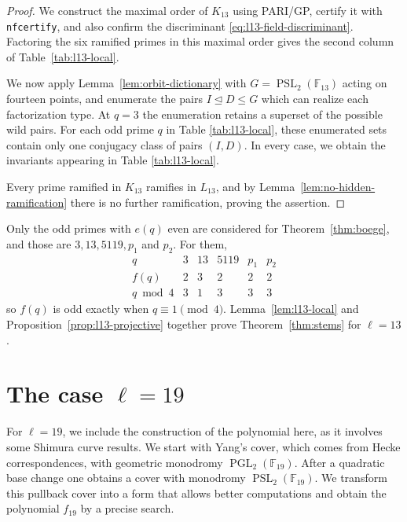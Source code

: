 \documentclass[10pt]{amsart}
\numberwithin{equation}{section}
\theoremstyle{definition}
\theoremstyle{remark}
\newcommand{\F}{\mathbb{F}}
\newcommand{\PGL}{\operatorname{PGL}}
\newcommand{\PSL}{\operatorname{PSL}}
\begin{document}
\begin{proof}
We construct the maximal order of $K_{13}$ using PARI/GP, certify it with
\texttt{nfcertify}, and also confirm the discriminant \eqref{eq:l13-field-discriminant}. Factoring the six ramified primes in this maximal order gives the second column of Table~\ref{tab:l13-local}.


We now apply Lemma~\ref{lem:orbit-dictionary} with $G=\PSL_2(\F_{13})$ acting on fourteen points, and enumerate the pairs $I\trianglelefteq D\leq G$ which can realize each factorization type. At $q=3$ the enumeration retains a superset of the possible wild pairs. For each odd prime $q$ in Table \ref{tab:l13-local}, these enumerated sets contain only one conjugacy class of pairs $(I,D)$. In every case, we obtain the invariants appearing in Table \ref{tab:l13-local}. 


Every prime ramified in $K_{13}$ ramifies in $L_{13}$, and by
Lemma~\ref{lem:no-hidden-ramification} there is no further ramification, proving the assertion.







\end{proof}

Only the odd primes with $e(q)$ even are considered for Theorem~\ref{thm:boege}, and
those are $3,13,5119,p_1$ and $p_2$.  For them,
\[
\begin{array}{c|ccccc}
 q & 3&13&5119&p_1&p_2\\
 \hline
 f(q) & 2&3&2&2&2\\
 q\bmod4 & 3&1&3&3&3
\end{array}
\]
so $f(q)$ is odd exactly when $q\equiv1\pmod 4$.  Lemma~\ref{lem:l13-local}
and Proposition~\ref{prop:l13-projective} together prove
Theorem~\ref{thm:stems} for $\ell=13$.

\section{The case \texorpdfstring{$\ell=19$}{l=19}}\label{sec:l19}

For $\ell=19$, we include the construction of the polynomial here, as it involves some Shimura curve results. We start with Yang's \cite{YangSchwarzian} cover, which comes from Hecke correspondences,  with geometric monodromy $\PGL_2(\F_{19})$. After a quadratic base change one obtains a cover with monodromy $\PSL_2(\F_{19})$. We transform this pullback cover into a form that allows better computations and obtain the polynomial $f_{19}$ by a precise search.
  
\end{document}
